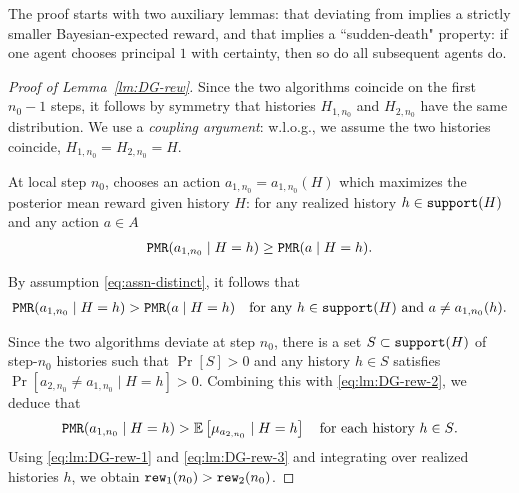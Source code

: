 The proof starts with two auxiliary lemmas: that deviating from \DynGreedy implies a strictly smaller Bayesian-expected reward, and that \HardMax implies a ``sudden-death" property: if one agent chooses principal $1$ with certainty, then so do all subsequent agents do. 


\begin{lemma}\label{lm:DG-rew}
\end{lemma}


\begin{proof}[Proof of Lemma~\ref{lm:DG-rew}]
Since the two algorithms coincide on the first $n_0-1$ steps, it follows by symmetry that histories $H_{1,n_0}$ and $H_{2,n_0}$ have the same distribution. We use a \emph{coupling argument}: w.l.o.g., we assume the two histories coincide,
    $H_{1,n_0} = H_{2,n_0} = H$.

At local step $n_0$, \DynGreedy chooses an action $a_{1,n_0} = a_{1,n_0}(H)$
which maximizes the posterior mean reward given history $H$: for any realized history $h\in \mathtt{support}(H)$ and any action $a\in A$
\begin{align}\label{eq:lm:DG-rew-1}
 \mathtt{PMR}(a_{1,n_0} \mid H = h) \geq \mathtt{PMR}(a \mid H=h).
\end{align}


By assumption \eqref{eq:assn-distinct}, it follows that 
\begin{align}\label{eq:lm:DG-rew-2}
 \mathtt{PMR}(a_{1,n_0} \mid H = h) > \mathtt{PMR}(a \mid H=h)
 \quad \text{for any $h\in \mathtt{support}(H)$ and $a\neq a_{1,n_0}(h)$.}
\end{align}

Since the two algorithms deviate at step $n_0$, there is a set $S\subset \mathtt{support}(H)$ of step-$n_0$ histories such that $\Pr[S]>0$ and any history $h\in S$ satisfies
    $\Pr[a_{2,n_0}\neq a_{1,n_0} \mid H=h]>0$.
Combining this with \eqref{eq:lm:DG-rew-2}, we deduce that 
\begin{align}\label{eq:lm:DG-rew-3}
 \PMR(a_{1,n_0} \mid H = h) > \E\left[ \mu_{a_{2,n_0}}\mid H=h \right]
 \quad\text{for each history $h\in S$}.
\end{align}
Using \eqref{eq:lm:DG-rew-1} and \eqref{eq:lm:DG-rew-3} and integrating over realized histories $h$, we obtain
    $\mathtt{rew}_1(n_0) > \mathtt{rew}_2(n_0)$.
\end{proof}


